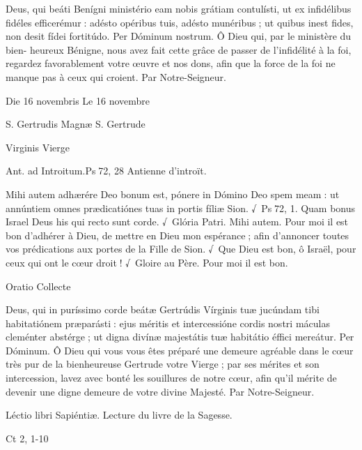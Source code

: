\begin{paracol}{2}
Deus, qui beáti Benígni ministério  eam nobis grátiam contulísti, ut ex infidélibus fidéles efficerémur : adésto opéribus tuis, adésto munéribus ; ut quibus inest fides, non desit fídei fortitúdo. Per Dóminum nostrum.
\switchcolumn
Ô Dieu qui, par le ministère du bien- heureux Bénigne, nous avez fait cette grâce de passer de l’infidélité à la foi, regardez favorablement votre œuvre et nos dons, afin que la force de la foi ne manque pas à ceux qui croient. Par Notre-Seigneur.
\switchcolumn*

Die 16 novembris
\switchcolumn
Le 16 novembre
\switchcolumn*

S. Gertrudis Magnæ
\switchcolumn
S. Gertrude
\switchcolumn*

Virginis
\switchcolumn
Vierge
\switchcolumn*

Ant. ad Introitum.\hfill Ps 72, 28
\switchcolumn
Antienne d’introït.
\switchcolumn*

Mihi autem adhærére Deo bonum  est, pónere in Dómino Deo spem meam : ut annúntiem omnes prædicatiónes tuas in portis fíliæ Sion. √~Ps 72, 1. Quam bonus Israel Deus his qui recto sunt corde. √~Glória Patri. Mihi autem.
\switchcolumn
Pour moi il est bon d’adhérer à Dieu,  de mettre en Dieu mon espérance ; afin d’annoncer toutes vos prédications aux portes de la Fille de Sion. √~Que Dieu est bon, ô Israël, pour ceux qui ont le cœur droit ! √~Gloire au Père. Pour moi il est bon.
\switchcolumn*

Oratio
\switchcolumn
Collecte
\switchcolumn*

Deus, qui in puríssimo corde beátæ  Gertrúdis Vírginis tuæ jucúndam tibi habitatiónem præparásti : ejus méritis et intercessióne cordis nostri máculas cleménter abstérge ; ut digna divínæ majestátis tuæ habitátio éffici mereátur. Per Dóminum.
\switchcolumn
Ô Dieu qui vous vous êtes préparé une  demeure agréable dans le cœur très pur de la bienheureuse Gertrude votre Vierge ; par ses mérites et son intercession, lavez avec bonté les souillures de notre cœur, afin qu’il mérite de devenir une digne demeure de votre divine Majesté. Par Notre-Seigneur.
\switchcolumn*

Léctio libri Sapiéntiæ.
\switchcolumn
Lecture du livre de la Sagesse.
\switchcolumn*

Ct 2, 1-10
\switchcolumn

\switchcolumn*


\end{paracol}
